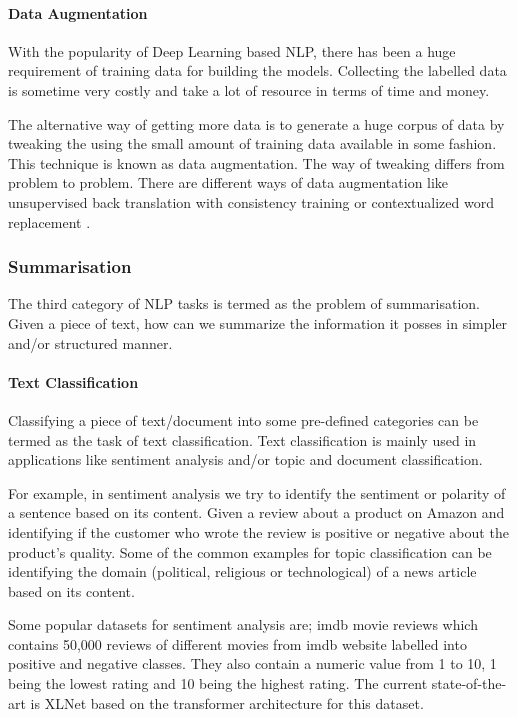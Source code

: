 \paragraph{Data Augmentation}
With the popularity of Deep Learning based NLP, there has been a huge requirement of training data for building the models. Collecting the labelled data is sometime very costly and take a lot of resource in terms of time and money. 

The alternative way of getting more data is to generate a huge corpus of data by tweaking the using the small amount of training data available in some fashion. This technique is known as data augmentation. The way of tweaking differs from problem to problem. There are different ways of data augmentation like unsupervised back translation with consistency training \cite{Xie2019} or contextualized word replacement \cite{kobayashi2018contextual}.

\subsubsection{Summarisation}
The third category of NLP tasks is termed as the problem of summarisation. Given a piece of text, how can we summarize the information it posses in simpler and/or structured manner. 

\paragraph{Text Classification}
Classifying a piece of text/document into some pre-defined categories can be termed as the task of text classification. Text classification is mainly used in applications like sentiment analysis and/or topic and document classification. 

For example, in sentiment analysis we try to identify the sentiment or polarity of a sentence based on its content. Given a review about a product on Amazon and identifying if the customer who wrote the review is positive or negative about the product's quality. Some of the common examples for topic classification can be identifying the domain (political, religious or technological) of a news article based on its content.

Some popular datasets for sentiment analysis are; imdb movie reviews which contains 50,000 reviews of different movies from imdb website labelled into positive and negative classes. They also contain a numeric value from 1 to 10, 1 being the lowest rating and 10 being the highest rating. The current state-of-the-art is XLNet based on the transformer architecture for this \cite{yang2019xlnet} dataset.

